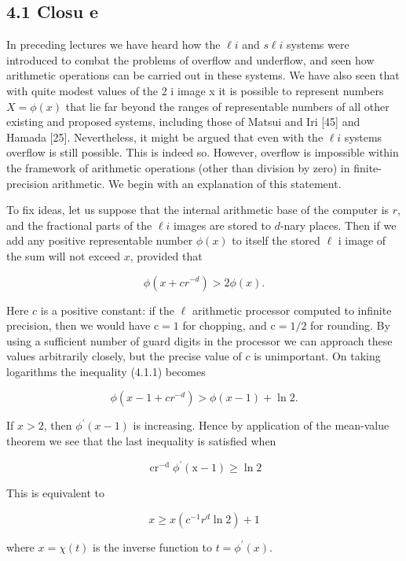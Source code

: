 \documentclass[10pt]{article}
\begin{document}
\subsection*{4.1 Closu e}
In preceding lectures we have heard how the $\ell i$ and $s \ell i$ systems were introduced to combat the problems of overflow and underflow, and seen how arithmetic operations can be carried out in these systems. We have also seen that with quite modest values of the 2 i image x it is possible to represent numbers $X=\phi(x)$ that lie far beyond the ranges of representable numbers of all other existing and proposed systems, including those of Matsui and Iri [45] and Hamada [25]. Nevertheless, it might be argued that even with the $\ell i$ systems overflow is still possible. This is indeed so. However, overflow is impossible within the framework of arithmetic operations (other than division by zero) in finite-precision arithmetic. We begin with an explanation of this statement.

To fix ideas, let us suppose that the internal arithmetic base of the computer is $r$, and the fractional parts of the $\ell i$ images are stored to $d$-nary places. Then if we add any positive representable number $\phi(x)$ to itself the stored $\ell$ i image of the sum will not exceed $x$, provided that


\begin{equation*}
\phi\left(x+c r^{-d}\right)>2 \phi(x) . \tag{4.1.1}
\end{equation*}


Here $c$ is a positive constant: if the $\ell$ arithmetic processor computed to infinite precision, then we would have $\mathrm{c}=1$ for chopping, and $\mathrm{c}=1 / 2$ for rounding. By using a sufficient number of guard digits in the processor we can approach these values arbitrarily closely, but the precise value of $c$ is unimportant. On taking logarithms the inequality (4.1.1) becomes

$$
\phi\left(x-1+c r^{-d}\right)>\phi(x-1)+\ln 2 .
$$

If $x>2$, then $\phi^{\prime}(x-1)$ is increasing. Hence by application of the mean-value theorem we see that the last inequality is satisfied when

$$
\operatorname{cr}^{-\mathrm{d}} \phi^{\prime}(\mathrm{x}-1) \geqslant \ln 2
$$

This is equivalent to

$$
x \geqslant x\left(c^{-1} r^{d} \ln 2\right)+1
$$

where $x=\chi(t)$ is the inverse function to $t=\phi^{\prime}(x)$.
\end{document}
